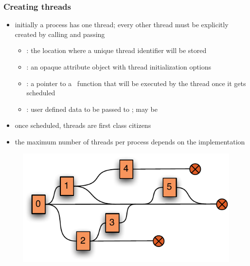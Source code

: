 \begin{frame}[fragile]
%
  \frametitle{Creating threads}
  \begin{itemize}
%
  \begin{C}
int pthread_create(
    pthread_t* id, const pthread_attr_t* attr,
    void* (*startup)(void*), void* arg);
  \end{C}
%
\item initially a process has one thread; every other thread must be explicitly created
  by calling  and passing
  \begin{itemize}
  \item {}: the location where a unique thread identifier will be stored
  \item {}: an opaque attribute object with thread initialization options
  \item {}: a pointer to a \CC\ function that will be executed by the thread
    once it gets scheduled
  \item {}: user defined data to be passed to ; may be \NULL
  \end{itemize}
%
  \item once scheduled, threads are first class citizens
%
  \item the maximum number of threads per process depends on the implementation
%
  \end{itemize}
%
    \begin{figure}
      \centering
      \includegraphics[scale=0.5]{figures/threads.pdf}
    \end{figure}
%
\end{frame}

